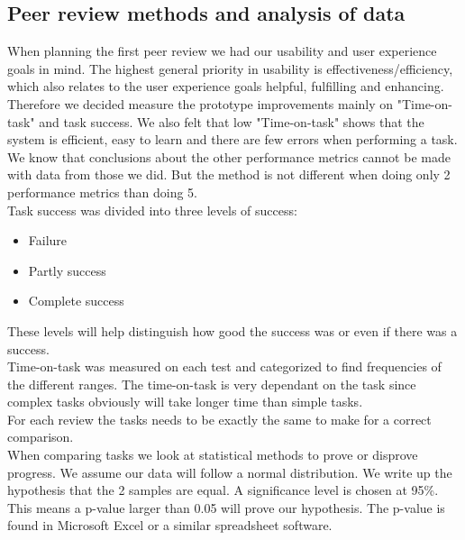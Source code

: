 \subsection{Peer review methods and analysis of data}
When planning the first peer review we had our usability and user experience goals in mind. The highest general priority in usability is effectiveness/efficiency, which also relates to the user experience goals helpful, fulfilling and enhancing. Therefore we decided measure the prototype improvements mainly on "Time-on-task" and task success. We also felt that low "Time-on-task" shows that the system is efficient, easy to learn and there are few errors when performing a task. We know that conclusions about the other performance metrics cannot be made with data from those we did. But the method is not different when doing only 2 performance metrics than doing 5.\\
Task success was divided into three levels of success:
\begin{itemize}
\item Failure
\item Partly success
\item Complete success
\end{itemize}
These levels will help distinguish how good the success was or even if there was a success.\\
Time-on-task was measured on each test and categorized to find frequencies of the different ranges. The time-on-task is very dependant on the task since complex tasks obviously will take longer time than simple tasks.\\
For each review the tasks needs to be exactly the same to make for a correct comparison.\\

When comparing tasks we look at statistical methods to prove or disprove progress. We assume our data will follow a normal distribution. We write up the hypothesis that the 2 samples are equal. A significance level is chosen at 95\%. This means a p-value larger than 0.05 will prove our hypothesis. The p-value is found in Microsoft Excel or a similar spreadsheet software. 
